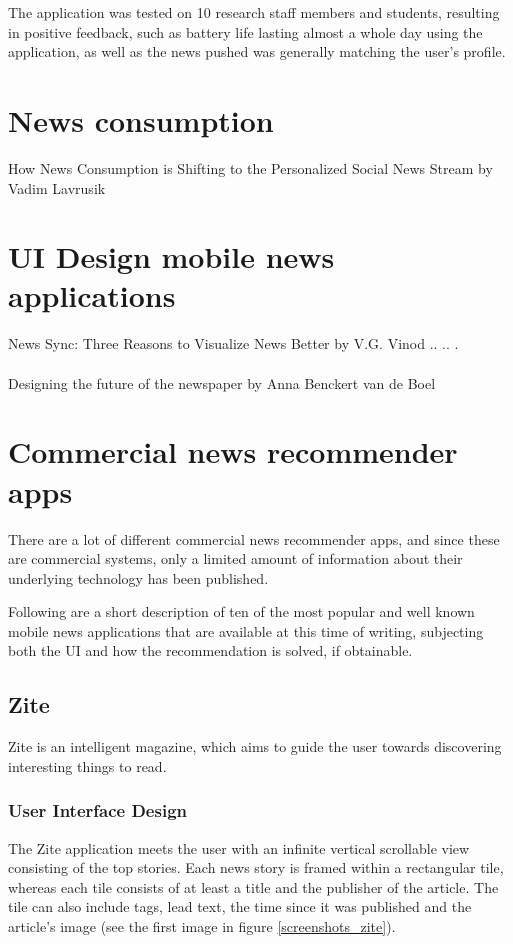 The application was tested on 10 research staff members and students, resulting in positive feedback, such as battery life lasting almost a whole day using the application, as well as the news pushed was generally matching the user's profile.

\section{News consumption}
How News Consumption is Shifting to the Personalized Social News Stream by Vadim Lavrusik

\section{UI Design mobile news applications}
News Sync: Three Reasons to Visualize News Better by V.G. Vinod .. .. .
\\\\
Designing the future of the newspaper by Anna Benckert van de Boel

\section{Commercial news recommender apps}
There are a lot of different commercial news recommender apps, and since these are commercial systems, only a limited amount of information about their underlying technology has been published.

Following are a short description of ten of the most popular and well known mobile news applications that are available at this time of writing, subjecting both the UI and how the recommendation is solved, if obtainable.


\subsection{Zite}
Zite is an intelligent magazine, which aims to guide the user towards discovering interesting things to read\cite{zite_appstore}.

\subsubsection{User Interface Design}
The Zite application meets the user with an infinite vertical scrollable view consisting of the top stories. Each news story is framed within a rectangular tile, whereas each tile consists of at least a title and the publisher of the article. The tile can also include tags, lead text, the time since it was published and the article's image (see the first image in figure \ref{screenshots_zite}).

